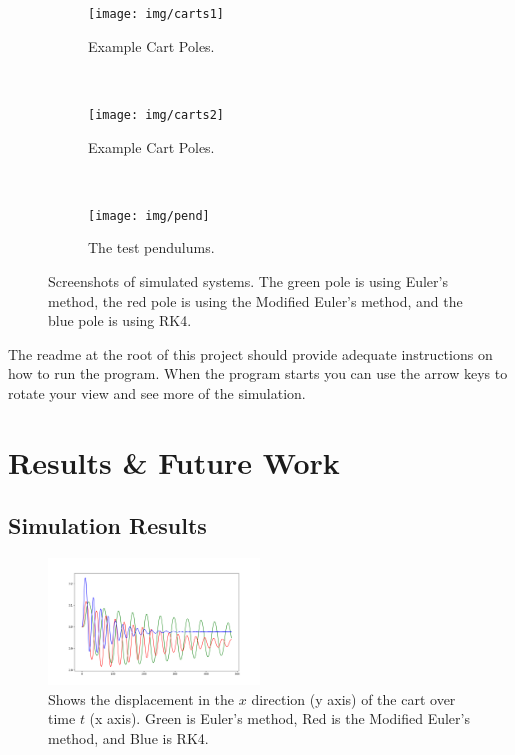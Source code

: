 \documentclass[12pt]{article}
\begin{document}
\begin{figure}[!ht]
    \centering
    \begin{subfigure}[b]{0.3\textwidth}
        \texttt{[image: img/carts1]}
        \caption{Example Cart Poles.}
        \label{fig:gull}
    \end{subfigure}
    ~ %
    \begin{subfigure}[b]{0.3\textwidth}
        \texttt{[image: img/carts2]}
        \caption{Example Cart Poles.}
        \label{fig:tiger}
    \end{subfigure}
    ~ %
    \begin{subfigure}[b]{0.3\textwidth}
        \texttt{[image: img/pend]}
        \caption{The test pendulums.}
        \label{fig:mouse}
    \end{subfigure}
    \caption{Screenshots of simulated systems. The green pole is using Euler's method,
    the red pole is using the Modified Euler's method, and the blue pole is using RK4.}\label{fig:animals}
\end{figure}

The readme at the root of this project should provide adequate instructions on how
to run the program. When the program starts you can use the arrow keys to rotate
your view and see more of the simulation.

\section{Results \& Future Work}

\subsection{Simulation Results}

\begin{figure}[!ht]
 \centering
 \includegraphics[width=0.5\textwidth]{../data/Figure_1}
 \caption{Shows the displacement in the $x$ direction (y axis) of the cart
 over time $t$ (x axis). Green is Euler's method, Red is the Modified Euler's method, and Blue is RK4.}
 \label{fig:yeet}
\end{figure}
\end{document}
